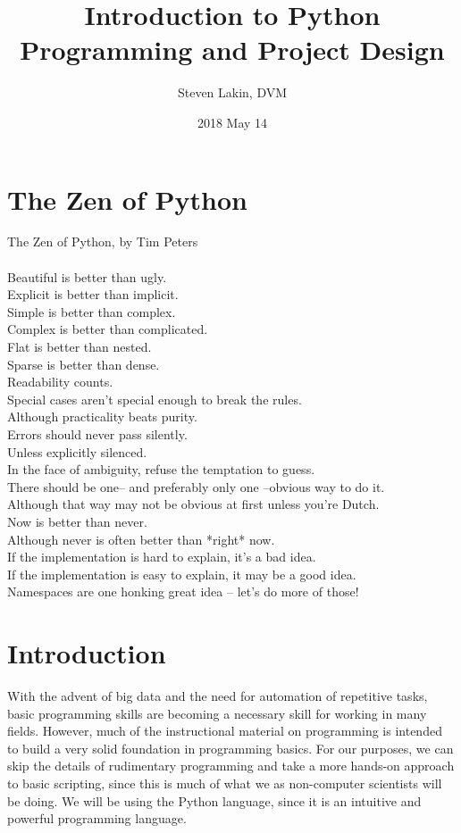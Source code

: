 \documentclass[a4paper,11pt]{article}
\title{Introduction to Python Programming and Project Design}
\author{Steven Lakin, DVM}
\date{2018 May 14}
\begin{document}
\maketitle

\pagebreak

\tableofcontents


\pagebreak

\section{The Zen of Python}
The Zen of Python, by Tim Peters \\
\\
Beautiful is better than ugly. \\
Explicit is better than implicit. \\
Simple is better than complex. \\
Complex is better than complicated. \\
Flat is better than nested. \\
Sparse is better than dense. \\
Readability counts. \\
Special cases aren't special enough to break the rules. \\
Although practicality beats purity. \\
Errors should never pass silently. \\
Unless explicitly silenced. \\
In the face of ambiguity, refuse the temptation to guess. \\
There should be one-- and preferably only one --obvious way to do it. \\
Although that way may not be obvious at first unless you're Dutch. \\
Now is better than never. \\
Although never is often better than *right* now. \\
If the implementation is hard to explain, it's a bad idea. \\
If the implementation is easy to explain, it may be a good idea. \\
Namespaces are one honking great idea -- let's do more of those!

\pagebreak

\section{Introduction}
\par
With the advent of big data and the need for automation of repetitive tasks, basic programming
skills are becoming a necessary skill for working in many fields. However, much of the instructional
material on programming is intended to build a very solid foundation in programming basics. For our
purposes, we can skip the details of rudimentary programming and take a more hands-on approach to
basic scripting, since this is much of what we as non-computer scientists will be doing. We will be
using the Python language, since it is an intuitive and powerful programming language. \par
\end{document}
